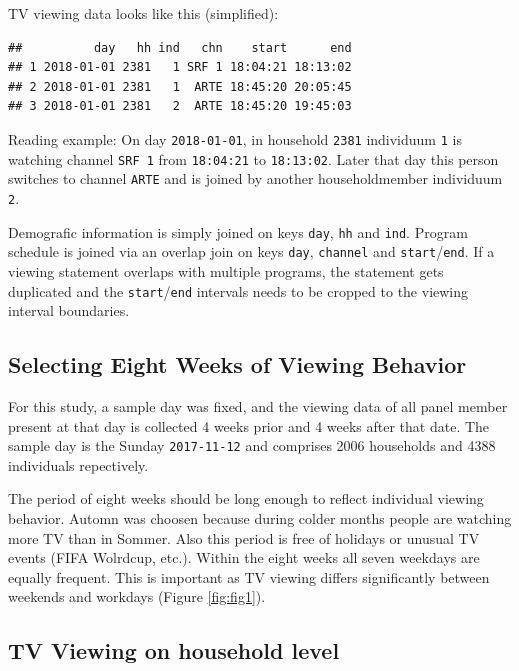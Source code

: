 \documentclass[]{article}
\begin{document}
TV viewing data looks like this (simplified):

\begin{verbatim}
##          day   hh ind   chn    start      end
## 1 2018-01-01 2381   1 SRF 1 18:04:21 18:13:02
## 2 2018-01-01 2381   1  ARTE 18:45:20 20:05:45
## 3 2018-01-01 2381   2  ARTE 18:45:20 19:45:03
\end{verbatim}

Reading example: On day \texttt{2018-01-01}, in household \texttt{2381}
individuum \texttt{1} is watching channel \texttt{SRF\ 1} from
\texttt{18:04:21} to \texttt{18:13:02}. Later that day this person
switches to channel \texttt{ARTE} and is joined by another
householdmember individuum \texttt{2}.

Demografic information is simply joined on keys \texttt{day},
\texttt{hh} and \texttt{ind}. Program schedule is joined via an overlap
join on keys \texttt{day}, \texttt{channel} and
\texttt{start}/\texttt{end}. If a viewing statement overlaps with
multiple programs, the statement gets duplicated and the
\texttt{start}/\texttt{end} intervals needs to be cropped to the viewing
interval boundaries.

\subsection{Selecting Eight Weeks of Viewing
Behavior}\label{selecting-eight-weeks-of-viewing-behavior}

For this study, a sample day was fixed, and the viewing data of all
panel member present at that day is collected 4 weeks prior and 4 weeks
after that date. The sample day is the Sunday \texttt{2017-11-12} and
comprises 2006 households and 4388 individuals repectively.

The period of eight weeks should be long enough to reflect individual
viewing behavior. Automn was choosen because during colder months people
are watching more TV than in Sommer. Also this period is free of
holidays or unusual TV events (FIFA Wolrdcup, etc.). Within the eight
weeks all seven weekdays are equally frequent. This is important as TV
viewing differs significantly between weekends and workdays (Figure
\ref{fig:fig1}).

\subsection{TV Viewing on household
level}\label{tv-viewing-on-household-level}
\end{document}
